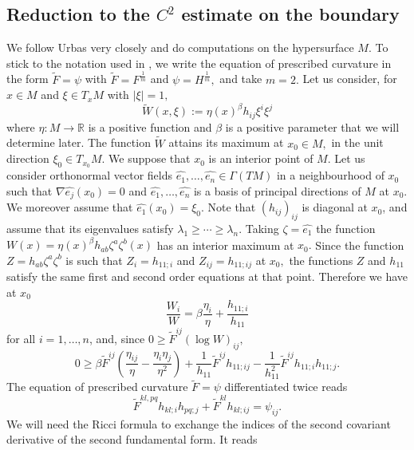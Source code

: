 \documentclass[10pt,reqno,oneside]{amsart}
\theoremstyle{definition}
\theoremstyle{remark}
\newcommand{\R}{\mathbb{R}}
\begin{document}
\subsection{Reduction to the $C^2$ estimate on the boundary} We follow Urbas \cite{Ur} very closely and do computations on the hypersurface $M.$ To stick to the notation used in \cite{Ur}, we write the equation of prescribed curvature in the form $\widetilde{F}=\psi$ with $\widetilde{F}=F^{\frac{1}{m}}$ and $\psi=H^{\frac{1}{m}},$ and take $m=2.$ Let us consider, for $x\in M$ and $\xi\in T_xM$ with $|\xi|=1,$
$$\widetilde{W}(x,\xi):=\eta(x)^\beta h_{ij}\xi^i\xi^j$$
where $\eta:M\rightarrow\R$ is a positive function and $\beta$ is a positive parameter that we will determine later. The function $\widetilde{W}$ attains its maximum at $x_0\in M,$ in the unit direction $\xi_0\in T_{x_0}M.$ We suppose that $x_0$ is an interior point of $M.$ Let us consider orthonormal vector fields $\widehat{e_1},\ldots,\widehat{e_n}\in\Gamma(TM)$ in a neighbourhood of $x_0$ such that $\nabla\widehat{e_j}(x_0)=0$ and $\widehat{e_1},\ldots,\widehat{e_n}$ is a basis of principal directions of $M$ at $x_0.$ We moreover assume that $\widehat{e_1}(x_0)=\xi_0.$ Note that $(h_{ij})_{ij}$ is diagonal at $x_0$, and assume that its eigenvalues satisfy $\lambda_1\geq\cdots\geq\lambda_n.$ Taking $\zeta=\widehat{e_1}$ the function $W(x)=\eta(x)^\beta h_{ab}\zeta^a\zeta^b(x)$ has an interior maximum at $x_0.$ Since the function $Z=h_{ab}\zeta^a\zeta^b$ is such that $Z_i=h_{11;i}$ and $Z_{ij}=h_{11;ij}$ at $x_0,$ the functions $Z$ and $h_{11}$ satisfy the same first and second order equations at that point. Therefore we have at $x_0$
\begin{equation}\label{ppemax C2 cond extr}
\frac{W_i}{W}=\beta\frac{\eta_i}{\eta}+\frac{h_{11;i}}{h_{11}} 
\end{equation}
for all $i=1,\ldots,n$, and, since $0\geq \widetilde{F}^{ij}(\log W)_{ij},$
\begin{equation}\label{ppemax C2 cond max}
0\geq \beta \widetilde{F}^{ij}\left(\frac{\eta_{ij}}{\eta}-\frac{\eta_i\eta_j}{\eta^2}\right)+\frac{1}{h_{11}}\widetilde{F}^{ij}h_{11;ij}-\frac{1}{h_{11}^2}\widetilde{F}^{ij}h_{11;i}h_{11;j}.
\end{equation}
The equation of prescribed curvature $\widetilde{F}=\psi$ differentiated twice reads
\begin{equation}\label{C2 max eq der 2}
\widetilde{F}^{kl,pq}h_{kl;i}h_{pq;j}+\widetilde{F}^{kl}h_{kl;ij}=\psi_{ij}.
\end{equation}
We will need the Ricci formula to exchange the indices of the second covariant derivative of the second fundamental form. It reads 
\end{document}
